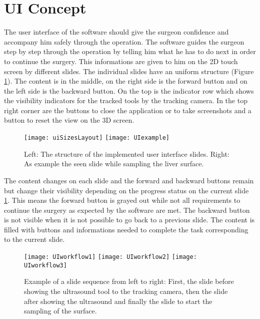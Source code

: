 \section{UI Concept}
The user interface of the software should give the surgeon confidence and
accompany him safely through the operation. The software guides the surgeon step
by step through the operation by telling him what he has to do next in order to
continue the surgery. This informations are given to him on the 2D
touch screen by different slides. The individual slides have an uniform structure (Figure
\ref{fig:uiExample}). The content is in the middle, on the right side is the
forward button and on the left side is the backward button. On the top is the
indicator row which shows the visibility indicators for the tracked tools by the
tracking camera. In the top right corner are the buttons to close the
application or to take screenshots and a button to reset the view on the 3D screen. 
\begin{figure}[H]
  \centering
  \texttt{[image: uiSizesLayout]} 
  \endminipage
  \hfill
  \texttt{[image: UIexample]}
  \endminipage
  \hfill 
 \caption{Left: The structure of the implemented user interface slides. Right: As
   example the seen slide while sampling the liver surface.}
  \label{fig:uiExample}
\end{figure}
The content changes on each slide and the forward and backward buttons
remain but change their visibility depending on the progress status on the
current slide \ref{fig:uiExample}. This means the forward button is grayed out while not all requirements to continue the surgery as
expected by the software are met. The backward button is not visible when it is
not possible to go back to a previous slide. The content is filled with buttons
and informations needed to complete the task corresponding to the current slide.



\begin{figure}[H]
  \centering
  \texttt{[image: UIworkflow1]} 
  \endminipage
  \hfill
  \texttt{[image: UIworkflow2]}
  \endminipage
  \hfill
  \texttt{[image: UIworkflow3]}
  \endminipage
  \hfill 
 \caption{Example of a slide sequence from left to right: First, the slide
   before showing the ultrasound tool to the tracking camera, then the slide
   after showing the ultrasound and finally the slide to start the sampling of
   the surface.}
  \label{fig:workflowExample}
\end{figure}
